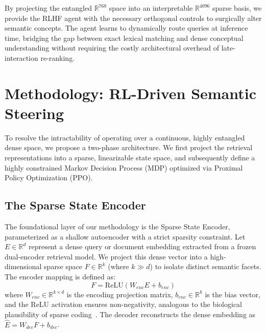 By projecting the entangled $\mathbb{R}^{768}$ space into an interpretable $\mathbb{R}^{4096}$ sparse basis, we provide the RLHF agent with the necessary orthogonal controls to surgically alter semantic concepts. The agent learns to dynamically route queries at inference time, bridging the gap between exact lexical matching and dense conceptual understanding without requiring the costly architectural overhead of late-interaction re-ranking.

\section{Methodology: RL-Driven Semantic Steering}
To resolve the intractability of operating over a continuous, highly entangled dense space, we propose a two-phase architecture. We first project the retrieval representations into a sparse, linearizable state space, and subsequently define a highly constrained Markov Decision Process (MDP) optimized via Proximal Policy Optimization (PPO).

\subsection{The Sparse State Encoder}
The foundational layer of our methodology is the Sparse State Encoder, parameterized as a shallow autoencoder with a strict sparsity constraint. Let $E \in \mathbb{R}^d$ represent a dense query or document embedding extracted from a frozen dual-encoder retrieval model. We project this dense vector into a high-dimensional sparse space $F \in \mathbb{R}^k$ (where $k \gg d$) to isolate distinct semantic facets. The encoder mapping is defined as:
\begin{equation}
F = \text{ReLU}(W_{enc}E + b_{enc})
\end{equation}
where $W_{enc} \in \mathbb{R}^{k \times d}$ is the encoding projection matrix, $b_{enc} \in \mathbb{R}^k$ is the bias vector, and the ReLU activation ensures non-negativity, analogous to the biological plausibility of sparse coding~\citep{olshausen1996, glorot2011}. The decoder reconstructs the dense embedding as $\hat{E} = W_{dec}F + b_{dec}$.

